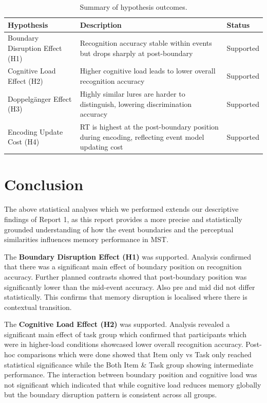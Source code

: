 \documentclass[
  12pt,
]{article}
\begin{document}
\begin{longtable}[]{@{}
  >{\raggedright\arraybackslash}p{}
  >{\raggedright\arraybackslash}p{}
  >{\raggedright\arraybackslash}p{}@{}}
\caption{\label{tab:hypo} Summary of hypothesis outcomes.}\tabularnewline
\toprule
Hypothesis & Description & Status \\
\midrule
Boundary Disruption Effect (H1) & Recognition accuracy stable within events but drops sharply at post-boundary & Supported \\
Cognitive Load Effect (H2) & Higher cognitive load leads to lower overall recognition accuracy & Supported \\
Doppelgänger Effect (H3) & Highly similar lures are harder to distinguish, lowering discrimination accuracy & Supported \\
Encoding Update Cost (H4) & RT is highest at the post-boundary position during encoding, reflecting event model updating cost & Supported \\
\bottomrule
\end{longtable}

\section{Conclusion}\label{conclusion}

The above statistical analyses which we performed extends our descriptive findings of Report 1, as this report provides a more precise and statistically grounded understanding of how the event boundaries and the perceptual similarities influences memory performance in MST.

The \textbf{Boundary Disruption Effect (H1)} was supported. Analysis confirmed that there was a significant main effect of boundary position on recognition accuracy. Further planned contrasts showed that post-boundary position was significantly lower than the mid-event accuracy. Also pre and mid did not differ statistically. This confirms that memory disruption is localised where there is contextual transition.

The \textbf{Cognitive Load Effect (H2)} was supported. Analysis revealed a significant main effect of task group which confirmed that participants which were in higher-load conditions showcased lower overall recognition accuracy. Post-hoc comparisons which were done showed that Item only vs Task only reached statistical significance while the Both Item \& Task group showing intermediate performance. The interaction between boundary position and cognitive load was not significant which indicated that while cognitive load reduces memory globally but the boundary disruption pattern is consistent across all groups.
\end{document}
